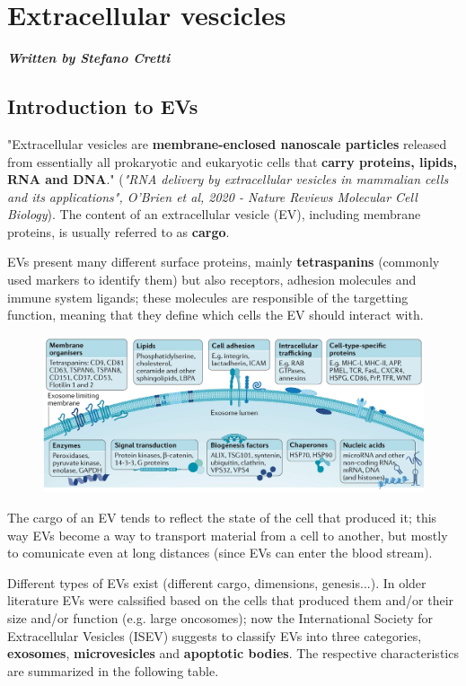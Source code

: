 \graphicspath{{chapters/TumorEvAndVesciclesImages/}}

\chapter{Extracellular vescicles}

\textbf{\textit{Written by Stefano Cretti}}

\section{Introduction to EVs}

  "Extracellular vesicles are \textbf{membrane-enclosed nanoscale particles} released from essentially all prokaryotic and eukaryotic cells that \textbf{carry proteins, lipids, RNA and DNA}." (\textit{"RNA delivery by extracellular vesicles in mammalian cells and its applications", O’Brien et al, 2020 - Nature Reviews Molecular Cell Biology}). The content of an extracellular vesicle (EV), including membrane proteins, is usually referred to as \textbf{cargo}.

  EVs present many different surface proteins, mainly \textbf{tetraspanins} (commonly used markers to identify them) but also receptors, adhesion molecules and immune system ligands; these molecules are responsible of the targetting function, meaning that they define which cells the EV should interact with. 

  \begin{figure}[H]
  \includegraphics[scale=0.34]{image_07.png}
  \end{figure}
   
  The cargo of an EV tends to reflect the state of the cell that produced it; this way EVs become a way to transport material from a cell to another, but mostly to comunicate even at long distances (since EVs can enter the blood stream).

  Different types of EVs exist (different cargo, dimensions, genesis...). In older literature EVs were calssified based on the cells that produced them and/or their size and/or function (e.g. large oncosomes); now the International Society for Extracellular Vesicles (ISEV) suggests to classify EVs into three categories, \textbf{exosomes}, \textbf{microvesicles} and \textbf{apoptotic bodies}. The respective characteristics are summarized in the following table.
  
